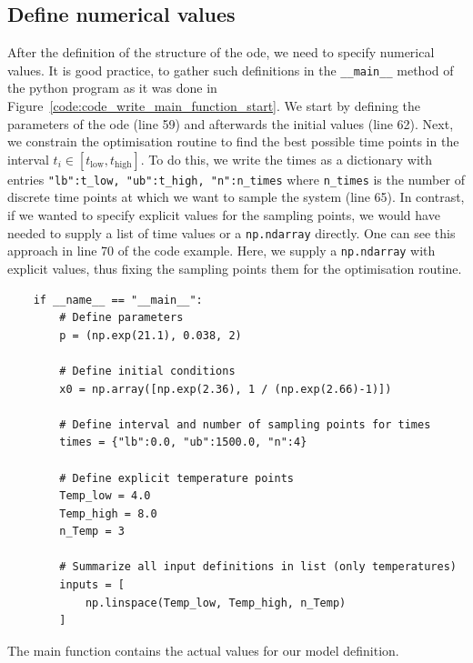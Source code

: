 \documentclass[10pt,A4paper]{article}
\begin{document}
\subsection*{Define numerical values}
After the definition of the structure of the \ac{ode}, we need to specify numerical values. 
It is good practice, to gather such definitions in the \texttt{__main__} method of the python program as it was done in Figure~\ref{code:code_write_main_function_start}. 
We start by defining the parameters of the \ac{ode} (line 59) and afterwards the initial values (line 62). 
Next, we constrain the optimisation routine to find the best possible time points in the interval $t_i\in\left[t_\text{low},t_\text{high}\right]$. 
To do this, we write the times as a dictionary with entries \texttt{{"lb":t_low, "ub":t_high, "n":n_times}} where \texttt{n_times} is the number of discrete time points at which we want to sample the system (line 65). 
In contrast, if we wanted to specify explicit values for the sampling points, we would have needed to supply a list of time values or a \texttt{np.ndarray} directly. 
One can see this approach  in line 70 of the code example. 
Here, we supply a \texttt{np.ndarray} with explicit values, thus fixing the sampling points them for the optimisation routine.
\begin{code}[h]
    \begin{verbatim}
    if __name__ == "__main__":
        # Define parameters
        p = (np.exp(21.1), 0.038, 2)

        # Define initial conditions
        x0 = np.array([np.exp(2.36), 1 / (np.exp(2.66)-1)])

        # Define interval and number of sampling points for times
        times = {"lb":0.0, "ub":1500.0, "n":4}

        # Define explicit temperature points
        Temp_low = 4.0
        Temp_high = 8.0
        n_Temp = 3

        # Summarize all input definitions in list (only temperatures)
        inputs = [
            np.linspace(Temp_low, Temp_high, n_Temp)
        ]
    \end{verbatim}
    \caption{The main function contains the actual values for our model definition.}
    \label{code:code_write_main_function_start}
\end{code}
\end{document}
